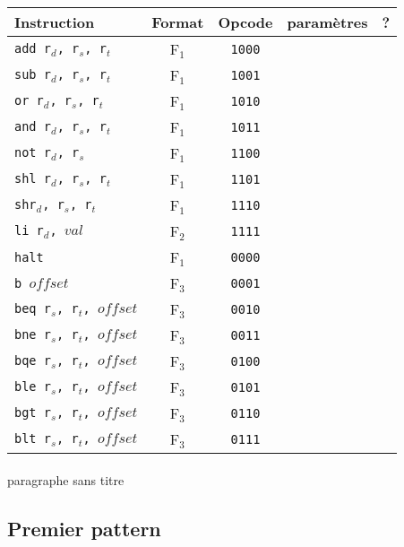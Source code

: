 \documentclass[a4paper]{article}
\begin{document}
			\begin{tabular}{|p{4cm}|c|c|c|c|}
			\hline Instruction & Format & Opcode & paramètres & ? \\ 
			\hline \texttt{add r$_{d}$, r$_{s}$, r$_{t}$} & F$_{1}$ & \texttt{1000} &  &  \\ 
			\hline \texttt{sub r$_{d}$, r$_{s}$, r$_{t}$} & F$_{1}$ & \texttt{1001} &  &  \\ 
			\hline \texttt{or r$_{d}$, r$_{s}$, r$_{t}$} & F$_{1}$ & \texttt{1010} &  &  \\ 
			\hline \texttt{and r$_{d}$, r$_{s}$, r$_{t}$} & F$_{1}$ & \texttt{1011} &  &  \\ 
			\hline \texttt{not r$_{d}$, r$_{s}$} & F$_{1}$ & \texttt{1100} &  &  \\ 
			\hline \texttt{shl r$_{d}$, r$_{s}$, r$_{t}$} & F$_{1}$ & \texttt{1101} &  &  \\ 
			\hline \texttt{shr$_{d}$, r$_{s}$, r$_{t}$} & F$_{1}$ & \texttt{1110} &  &  \\ 
			\hline \texttt{li r$_{d}$, $val$} & F$_{2}$ & \texttt{1111} &  &  \\ 
			\hline \texttt{halt} & F$_{1}$ & \texttt{0000} &  &  \\ 
			\hline \texttt{b $offset$} & F$_{3}$ & \texttt{0001} &  &  \\
			\hline \texttt{beq r$_{s}$, r$_{t}$, $offset$} & F$_{3}$ & \texttt{0010} &  &  \\ 
			\hline \texttt{bne r$_{s}$, r$_{t}$, $offset$} & F$_{3}$ & \texttt{0011} &  &  \\ 
			\hline \texttt{bqe r$_{s}$, r$_{t}$, $offset$} & F$_{3}$ & \texttt{0100} &  &  \\ 
			\hline \texttt{ble r$_{s}$, r$_{t}$, $offset$} & F$_{3}$ & \texttt{0101} &  &  \\ 
			\hline \texttt{bgt r$_{s}$, r$_{t}$, $offset$} & F$_{3}$ & \texttt{0110} &  &  \\ 
			\hline \texttt{blt r$_{s}$, r$_{t}$, $offset$} & F$_{3}$ & \texttt{0111} &  &  \\ 

			\hline 
			\end{tabular}
			
			\paragraph{}{paragraphe sans titre}
		
		\subsection{Premier pattern}
\end{document}
